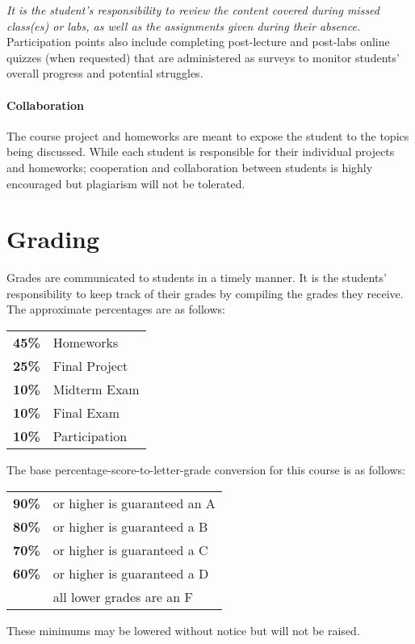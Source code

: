 \documentclass[12pt]{scrartcl}
\begin{document}
\textit{It is the student's responsibility to review the content covered during missed class(es) or labs, as well as the assignments given during their absence.}
Participation points also include completing post-lecture and post-labs online quizzes (when requested) that are administered as surveys to monitor students’ overall progress and potential struggles.

\paragraph{Collaboration} 
The course project and homeworks are meant to expose the student to the topics being discussed. 
While each student is responsible for their individual projects and homeworks; 
cooperation and collaboration between students is highly encouraged but plagiarism will not be tolerated.

\section{Grading}

Grades are communicated to students in a timely manner. 
It is the students’ responsibility to keep track of their grades by compiling the grades they receive. 
The approximate percentages are as follows:
\begin{center}
\begin{tabular}{rl}
\textbf{45\% } & Homeworks\\
\textbf{25\% } & Final Project\\
\textbf{10\% } & Midterm Exam\\
\textbf{10\% } & Final Exam \\
\textbf{10\% } & Participation\\
\end{tabular}
\end{center}

The base percentage-score-to-letter-grade conversion for this course is as follows: 
\begin{center}
\begin{tabular}{rl}
\textbf{90\%}& or higher is guaranteed an A \\
\textbf{80\%}& or higher is guaranteed a B \\
\textbf{70\%}& or higher is guaranteed a C \\
\textbf{60\%}& or higher is guaranteed a D \\
\textbf{}& all lower grades are an F 
\end{tabular}
\end{center}
These minimums may be lowered without notice but will not be raised. 
\end{document}
